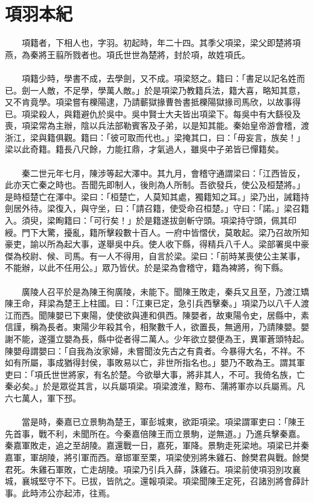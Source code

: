 
\section{項羽本紀}
　　項籍者，下相人也，字羽。初起時，年二十四。其季父項梁，梁父即楚將項燕，為秦將王翦所戮者也。項氏世世為楚將，封於項，故姓項氏。
\\\\
　　項籍少時，學書不成，去學劍，又不成。項梁怒之。籍曰：「書足以記名姓而已。劍一人敵，不足學，學萬人敵。」於是項梁乃教籍兵法，籍大喜，略知其意，又不肯竟學。項梁嘗有櫟陽逮，乃請蘄獄掾曹咎書抵櫟陽獄掾司馬欣，以故事得已。項梁殺人，與籍避仇於吳中。吳中賢士大夫皆出項梁下。每吳中有大繇役及喪，項梁常為主辦，陰以兵法部勒賓客及子弟，以是知其能。秦始皇帝游會稽，渡浙江，梁與籍俱觀。籍曰：「彼可取而代也。」梁掩其口，曰：「毋妄言，族矣！」梁以此奇籍。籍長八尺餘，力能扛鼎，才氣過人，雖吳中子弟皆已憚籍矣。
\\\\
　　秦二世元年七月，陳涉等起大澤中。其九月，會稽守通謂梁曰：「江西皆反，此亦天亡秦之時也。吾聞先即制人，後則為人所制。吾欲發兵，使公及桓楚將。」是時桓楚亡在澤中。梁曰：「桓楚亡，人莫知其處，獨籍知之耳。」梁乃出，誡籍持劍居外待。梁復入，與守坐，曰：「請召籍，使受命召桓楚。」守曰：「諾。」梁召籍入。須臾，梁眴籍曰：「可行矣！」於是籍遂拔劍斬守頭。項梁持守頭，佩其印綬。門下大驚，擾亂，籍所擊殺數十百人。一府中皆慴伏，莫敢起。梁乃召故所知豪吏，諭以所為起大事，遂舉吳中兵。使人收下縣，得精兵八千人。梁部署吳中豪傑為校尉、候、司馬。有一人不得用，自言於梁。梁曰：「前時某喪使公主某事，不能辦，以此不任用公。」眾乃皆伏。於是梁為會稽守，籍為裨將，徇下縣。
\\\\
　　廣陵人召平於是為陳王徇廣陵，未能下。聞陳王敗走，秦兵又且至，乃渡江矯陳王命，拜梁為楚王上柱國。曰：「江東已定，急引兵西擊秦。」項梁乃以八千人渡江而西。聞陳嬰已下東陽，使使欲與連和俱西。陳嬰者，故東陽令史，居縣中，素信謹，稱為長者。東陽少年殺其令，相聚數千人，欲置長，無適用，乃請陳嬰。嬰謝不能，遂彊立嬰為長，縣中從者得二萬人。少年欲立嬰便為王，異軍蒼頭特起。陳嬰母謂嬰曰：「自我為汝家婦，未嘗聞汝先古之有貴者。今暴得大名，不祥。不如有所屬，事成猶得封侯，事敗易以亡，非世所指名也。」嬰乃不敢為王。謂其軍吏曰：「項氏世世將家，有名於楚。今欲舉大事，將非其人，不可。我倚名族，亡秦必矣。」於是眾從其言，以兵屬項梁。項梁渡淮，黥布、蒲將軍亦以兵屬焉。凡六七萬人，軍下邳。
\\\\
　　當是時，秦嘉已立景駒為楚王，軍彭城東，欲距項梁。項梁謂軍吏曰：「陳王先首事，戰不利，未聞所在。今秦嘉倍陳王而立景駒，逆無道。」乃進兵擊秦嘉。秦嘉軍敗走，追之至胡陵。嘉還戰一日，嘉死，軍降。景駒走死梁地。項梁已并秦嘉軍，軍胡陵，將引軍而西。章邯軍至栗，項梁使別將朱雞石、餘樊君與戰。餘樊君死。朱雞石軍敗，亡走胡陵。項梁乃引兵入薛，誅雞石。項梁前使項羽別攻襄城，襄城堅守不下。已拔，皆阬之。還報項梁。項梁聞陳王定死，召諸別將會薛計事。此時沛公亦起沛，往焉。

